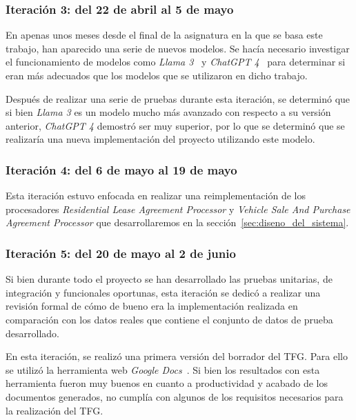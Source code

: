 \subsubsection*{Iteración 3: del 22 de abril al 5 de mayo}

En apenas unos meses desde el final de la asignatura en la que se basa este trabajo, han aparecido una serie de nuevos
modelos.
Se hacía necesario investigar el funcionamiento de modelos como \textit{Llama 3}~\cite{url_llama3} y
\textit{ChatGPT 4}~\cite{url_openai_gpt4} para determinar si eran más adecuados que los modelos que se utilizaron en
dicho trabajo.

Después de realizar una serie de pruebas durante esta iteración, se determinó que si bien \textit{Llama 3} es un
modelo mucho más avanzado con respecto a su versión anterior, \textit{ChatGPT 4} demostró ser muy superior, por lo que
se determinó que se realizaría una nueva implementación del proyecto utilizando este modelo.

\subsubsection*{Iteración 4: del 6 de mayo al 19 de mayo}

Esta iteración estuvo enfocada en realizar una reimplementación de los procesadores
\textit{Residential Lease Agreement Processor} y \textit{Vehicle Sale And Purchase Agreement Processor}
que desarrollaremos en la sección~\ref{sec:diseno_del_sistema}.

\subsubsection*{Iteración 5: del 20 de mayo al 2 de junio}

Si bien durante todo el proyecto se han desarrollado las pruebas unitarias, de integración y funcionales oportunas, esta
iteración se dedicó a realizar una revisión formal de cómo de bueno era la implementación realizada en comparación
con los datos reales que contiene el conjunto de datos de prueba desarrollado.

En esta iteración, se realizó una primera versión del borrador del TFG. Para ello se utilizó la herramienta web
\textit{Google Docs}~\cite{url_google_docs}.
Si bien los resultados con esta herramienta fueron muy buenos en cuanto a productividad y acabado de los documentos
generados, no cumplía con algunos de los requisitos necesarios para la realización del TFG.

